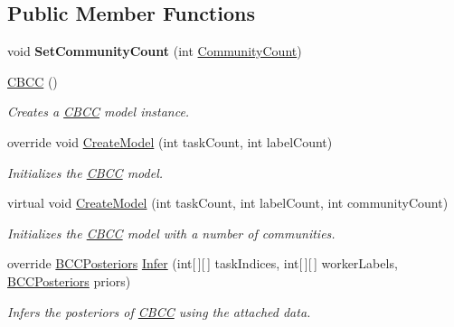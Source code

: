\subsection*{Public Member Functions}
\begin{DoxyCompactItemize}
\item 
\hypertarget{class_crowdsourcing_models_1_1_c_b_c_c_a05bfcace3952fc2c97faad29b01cc5c2}{}void {\bfseries Set\+Community\+Count} (int \hyperlink{class_crowdsourcing_models_1_1_c_b_c_c_ab5f136f59f47bf4c8b35c36b227ab88c}{Community\+Count})\label{class_crowdsourcing_models_1_1_c_b_c_c_a05bfcace3952fc2c97faad29b01cc5c2}

\item 
\hyperlink{class_crowdsourcing_models_1_1_c_b_c_c_af72e2fcbacf20df12023895de3639301}{C\+B\+C\+C} ()
\begin{DoxyCompactList}\small\item\em Creates a \hyperlink{class_crowdsourcing_models_1_1_c_b_c_c}{C\+B\+C\+C} model instance. \end{DoxyCompactList}\item 
override void \hyperlink{class_crowdsourcing_models_1_1_c_b_c_c_a9dc55362a1a756ced24bb3736075a180}{Create\+Model} (int task\+Count, int label\+Count)
\begin{DoxyCompactList}\small\item\em Initializes the \hyperlink{class_crowdsourcing_models_1_1_c_b_c_c}{C\+B\+C\+C} model. \end{DoxyCompactList}\item 
virtual void \hyperlink{class_crowdsourcing_models_1_1_c_b_c_c_aeea050e9262f77d369278506586ef862}{Create\+Model} (int task\+Count, int label\+Count, int community\+Count)
\begin{DoxyCompactList}\small\item\em Initializes the \hyperlink{class_crowdsourcing_models_1_1_c_b_c_c}{C\+B\+C\+C} model with a number of communities. \end{DoxyCompactList}\item 
override \hyperlink{class_crowdsourcing_models_1_1_b_c_c_posteriors}{B\+C\+C\+Posteriors} \hyperlink{class_crowdsourcing_models_1_1_c_b_c_c_a538743585401f436f10bfc46c26c767a}{Infer} (int\mbox{[}$\,$\mbox{]}\mbox{[}$\,$\mbox{]} task\+Indices, int\mbox{[}$\,$\mbox{]}\mbox{[}$\,$\mbox{]} worker\+Labels, \hyperlink{class_crowdsourcing_models_1_1_b_c_c_posteriors}{B\+C\+C\+Posteriors} priors)
\begin{DoxyCompactList}\small\item\em Infers the posteriors of \hyperlink{class_crowdsourcing_models_1_1_c_b_c_c}{C\+B\+C\+C} using the attached data. \end{DoxyCompactList}\end{DoxyCompactItemize}
